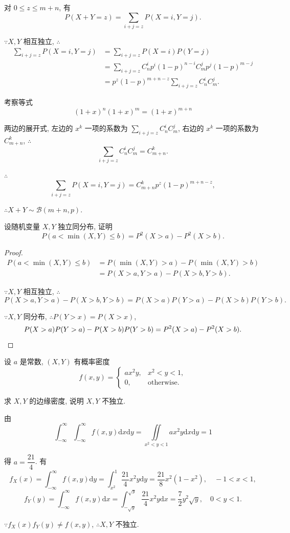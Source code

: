 \documentclass[color=black,device=normal,lang=cn]{elegantnote}
\numberwithin{equation}{section}
\theoremstyle{plain}
\numberwithin{exercise}{exsection}
\begin{document}
\begin{solution}
    对 $0\leq z\leq m+n$, 有
    \[P(X+Y=z)=\sum\limits_{i+j=z}P(X=i,Y=j).\]
    
    $\because X,Y$ 相互独立, $\therefore$
    \begin{align*}
        \sum\limits_{i+j=z}P(X=i,Y=j) & =\sum\limits_{i+j=z}P(X=i)P(Y=j) \\
        & =\sum\limits_{i+j=z}C_n^ip^i(1-p)^{n-i}C_m^jp^j(1-p)^{m-j} \\
        & =p^z(1-p)^{m+n-z}\sum\limits_{i+j=z}C_n^iC_m^j.
    \end{align*}

    考察等式
    \[(1+x)^n(1+x)^m=(1+x)^{m+n}\]

    两边的展开式, 左边的 $x^k$ 一项的系数为 $\sum\limits_{i+j=z}C_n^iC_m^j$, 右边的 $x^k$ 一项的系数为 $C_{m+n}^k$, $\therefore$
    \[\sum\limits_{i+j=z}C_n^iC_m^j=C_{m+n}^k.\]

    $\therefore$
    \[\sum\limits_{i+j=z}P(X=i,Y=j)=C_{m+n}^kp^z(1-p)^{m+n-z},\]

    $\therefore X+Y\sim\mathcal{B}(m+n,p)$.
\end{solution}
\addtocounter{exercise}{2}
\begin{exercise}%
    设随机变量 $X,Y$ 独立同分布, 证明
    \[P(a<\min(X,Y)\leq b)=P^2(X>a)-P^2(X>b).\]
\end{exercise}
\begin{proof}
    \begin{align*}
        P(a<\min(X,Y)\leq b) & =P(\min(X,Y)>a)-P(\min(X,Y)>b) \\
        & =P(X>a,Y>a)-P(X>b,Y>b).
    \end{align*}

    $\because X,Y$ 相互独立, $\therefore$
    \[P(X>a,Y>a)-P(X>b,Y>b)=P(X>a)P(Y>a)-P(X>b)P(Y>b).\]

    $\because X,Y$ 同分布, $\therefore P(Y>x)=P(X>x)$,
    \[P(X>a)P(Y>a)-P(X>b)P(Y>b)=P^2(X>a)-P^2(X>b).\qedhere\]
\end{proof}
\begin{exercise}%
    设 $a$ 是常数, $(X,Y)$ 有概率密度
    \[f(x,y)=\begin{cases}
        ax^2y, & x^2<y<1, \\
        0, & \text{otherwise}.
    \end{cases}\]

    求 $X,Y$ 的边缘密度, 说明 $X,Y$ 不独立.
\end{exercise}
\begin{solution}
    由
    \[\int_{-\infty}^\infty\int_{-\infty}^\infty f(x,y)\mathrm{d}x\mathrm{d}y=\iint\limits_{x^2<y<1}ax^2y\mathrm{d}x\mathrm{d}y=1\]

    得 $a=\dfrac{21}{4}$. 有
    \[f_X(x)=\int_{-\infty}^\infty f(x,y)\mathrm{d}y=\int_{x^2}^1\dfrac{21}{4}x^2y\mathrm{d}y=\dfrac{21}{8}x^2(1-x^2),\quad -1<x<1,\]
    \[f_Y(y)=\int_{-\infty}^\infty f(x,y)\mathrm{d}x=\int_{-\sqrt{y}}^{\sqrt{y}}\dfrac{21}{4}x^2y\mathrm{d}x=\dfrac{7}{2}y^2\sqrt{y},\quad 0<y<1.\]

    $\because f_X(x)f_Y(y)\neq f(x,y)$, $\therefore X,Y$ 不独立.
\end{solution}
\end{document}
